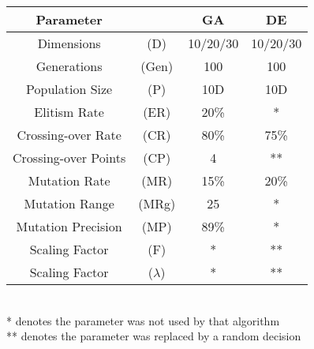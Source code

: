 \documentclass[paper=a4, fontsize=11pt]{scrartcl} %
\numberwithin{equation}{section} %
\numberwithin{figure}{section} %
\numberwithin{table}{section} %
\begin{document}
	\begin{minipage}{\linewidth}
		\centering
		\begin{tabular}{cc|cc}\label{T21}
			Parameter       			&				& GA 		& DE   		\\
			\hline
			Dimensions					& (D)			& 10/20/30	& 10/20/30	\\
			Generations					& (Gen)			& 100		& 100  		\\
			Population Size				& (P)			& 10D		& 10D  		\\
			Elitism Rate				& (ER)			& 20\%		& *    		\\
			Crossing-over Rate			& (CR)			& 80\%		& 75\%		\\
			Crossing-over Points		& (CP)			& 4			& **		\\
			Mutation Rate				& (MR)			& 15\%		& 20\%		\\
			Mutation Range				& (MRg)			& 25		& *			\\
			Mutation Precision			& (MP)			& 89\%		& *			\\
			Scaling Factor 				& (F)			& *			& **		\\
			Scaling Factor 				& ($\lambda$)	& *			& **		\\
		\end{tabular}
		\bigskip\\
		\small{* denotes the parameter was not used by that algorithm \\ ** denotes the parameter was replaced by a random decision}
	\end{minipage}
	
\end{document}
